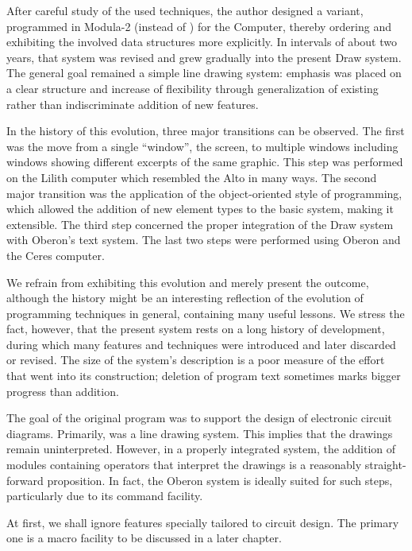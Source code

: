 After careful study of the used techniques, the author designed a variant, programmed in Modula-2 (instead of ) for the  Computer, thereby ordering and exhibiting the involved data structures more explicitly. In intervals of about two years, that system was revised and grew gradually into the present Draw system. The general goal remained a simple line drawing system: emphasis was placed on a clear structure and increase of flexibility through generalization of existing rather than indiscriminate addition of new features.

In the history of this evolution, three major transitions can be observed. The first was the move from a single ``window'', the screen, to multiple windows including windows showing different excerpts of the same graphic. This step was performed on the Lilith computer which resembled the Alto in many ways. The second major transition was the application of the object-oriented style of programming, which allowed the addition of new element types to the basic system, making it extensible. The third step concerned the proper integration of the Draw system with Oberon's text system. The last two steps were performed using Oberon and the Ceres computer.

We refrain from exhibiting this evolution and merely present the outcome, although the history might be an interesting reflection of the evolution of programming techniques in general, containing many useful lessons. We stress the fact, however, that the present system rests on a long history of development, during which many features and techniques were introduced and later discarded or revised. The size of the system's description is a poor measure of the effort that went into its construction; deletion of program text sometimes marks bigger progress than addition.

The goal of the original  program was to support the design of electronic circuit diagrams. Primarily,  was a line drawing system. This implies that the drawings remain uninterpreted. However, in a properly integrated system, the addition of modules containing operators that interpret the drawings is a reasonably straight-forward proposition. In fact, the Oberon system is ideally suited for such steps, particularly due to its command facility.

At first, we shall ignore features specially tailored to circuit design. The primary one is a macro facility to be discussed in a later chapter.

